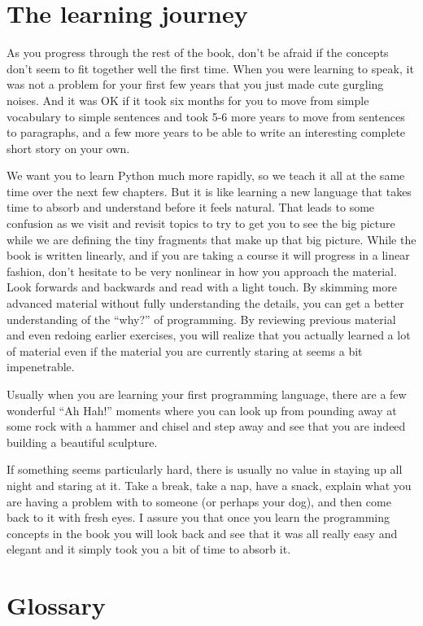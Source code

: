 \section{The learning journey}

As you progress through the rest of the book, don't be afraid if the concepts 
don't seem to fit together well the first time.  When you were learning to speak, 
it was not a problem  for your first few years that you just made cute gurgling noises.
And it was OK if it took six months for you to move from simple vocabulary to 
simple sentences and took 5-6 more years to move from sentences to paragraphs, and a
few more years to be able to write an interesting complete short story on your own.

We want you to learn Python much more rapidly, so we teach it all at the same time
over the next few chapters.  
But it is like learning a new language that takes time to absorb and understand
before it feels natural.
That leads to some confusion as we visit and revisit
topics to try to get you to see the big picture while we are defining the tiny
fragments that make up that big picture.  While the book is written linearly, and
if you are taking a course it will progress in a linear fashion, don't hesitate
to be very nonlinear in how you approach the material.  Look forwards and backwards
and read with a light touch.  By skimming more advanced material without 
fully understanding the details, you can get a better understanding of the ``why?'' 
of programming.  By reviewing previous material and even redoing earlier 
exercises, you will realize that you actually learned a lot of material even 
if the material you are currently staring at seems a bit impenetrable.

Usually when you are learning your first programming language, there are a few
wonderful ``Ah Hah!'' moments where you can look up from pounding away at some rock
with a hammer and chisel and step away and see that you are indeed building 
a beautiful sculpture.

If something seems particularly hard, there is usually no value in staying up all 
night and staring at it.   Take a break, take a nap, have a snack, explain what you 
are having a problem with to someone (or perhaps your dog), and then come back to it with
fresh eyes.  I assure you that once you learn the programming concepts in the book
you will look back and see that it was all really easy and elegant and it simply 
took you a bit of time to absorb it.

\section{Glossary}

